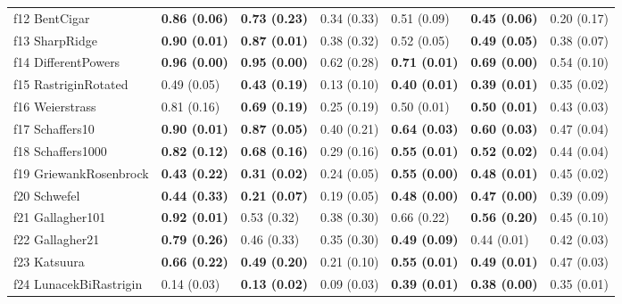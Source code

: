 \begin{table}
\begin{tabular}{lllllll}
f12 BentCigar & \textbf{0.86 (0.06)} & \textbf{0.73 (0.23)} & 0.34 (0.33) & 0.51 (0.09) & \textbf{0.45 (0.06)} & 0.20 (0.17) \\
f13 SharpRidge & \textbf{0.90 (0.01)} & \textbf{0.87 (0.01)} & 0.38 (0.32) & 0.52 (0.05) & \textbf{0.49 (0.05)} & 0.38 (0.07) \\
f14 DifferentPowers & \textbf{0.96 (0.00)} & \textbf{0.95 (0.00)} & 0.62 (0.28) & \textbf{0.71 (0.01)} & \textbf{0.69 (0.00)} & 0.54 (0.10) \\
f15 RastriginRotated & 0.49 (0.05) & \textbf{0.43 (0.19)} & 0.13 (0.10) & \textbf{0.40 (0.01)} & \textbf{0.39 (0.01)} & 0.35 (0.02) \\
f16 Weierstrass & 0.81 (0.16) & \textbf{0.69 (0.19)} & 0.25 (0.19) & 0.50 (0.01) & \textbf{0.50 (0.01)} & 0.43 (0.03) \\
f17 Schaffers10 & \textbf{0.90 (0.01)} & \textbf{0.87 (0.05)} & 0.40 (0.21) & \textbf{0.64 (0.03)} & \textbf{0.60 (0.03)} & 0.47 (0.04) \\
f18 Schaffers1000 & \textbf{0.82 (0.12)} & \textbf{0.68 (0.16)} & 0.29 (0.16) & \textbf{0.55 (0.01)} & \textbf{0.52 (0.02)} & 0.44 (0.04) \\
f19 GriewankRosenbrock & \textbf{0.43 (0.22)} & \textbf{0.31 (0.02)} & 0.24 (0.05) & \textbf{0.55 (0.00)} & \textbf{0.48 (0.01)} & 0.45 (0.02) \\
f20 Schwefel & \textbf{0.44 (0.33)} & \textbf{0.21 (0.07)} & 0.19 (0.05) & \textbf{0.48 (0.00)} & \textbf{0.47 (0.00)} & 0.39 (0.09) \\
f21 Gallagher101 & \textbf{0.92 (0.01)} & 0.53 (0.32) & 0.38 (0.30) & 0.66 (0.22) & \textbf{0.56 (0.20)} & 0.45 (0.10) \\
f22 Gallagher21 & \textbf{0.79 (0.26)} & 0.46 (0.33) & 0.35 (0.30) & \textbf{0.49 (0.09)} & 0.44 (0.01) & 0.42 (0.03) \\
f23 Katsuura & \textbf{0.66 (0.22)} & \textbf{0.49 (0.20)} & 0.21 (0.10) & \textbf{0.55 (0.01)} & \textbf{0.49 (0.01)} & 0.47 (0.03) \\
f24 LunacekBiRastrigin & 0.14 (0.03) & \textbf{0.13 (0.02)} & 0.09 (0.03) & \textbf{0.39 (0.01)} & \textbf{0.38 (0.00)} & 0.35 (0.01) \\
\bottomrule
\end{tabular}
\end{table}
